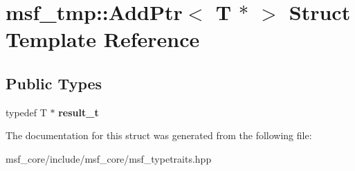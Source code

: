 \hypertarget{structmsf__tmp_1_1AddPtr_3_01T_01_5_01_4}{\section{msf\-\_\-tmp\-:\-:Add\-Ptr$<$ T $\ast$ $>$ Struct Template Reference}
\label{structmsf__tmp_1_1AddPtr_3_01T_01_5_01_4}
}
\subsection*{Public Types}
\begin{DoxyCompactItemize}
\item 
\hypertarget{structmsf__tmp_1_1AddPtr_3_01T_01_5_01_4_ad665c44a1e3f8154bb2033e80095a8cb}{typedef T $\ast$ {\bfseries result\-\_\-t}}\label{structmsf__tmp_1_1AddPtr_3_01T_01_5_01_4_ad665c44a1e3f8154bb2033e80095a8cb}

\end{DoxyCompactItemize}


The documentation for this struct was generated from the following file\-:\begin{DoxyCompactItemize}
\item 
msf\-\_\-core/include/msf\-\_\-core/msf\-\_\-typetraits.\-hpp\end{DoxyCompactItemize}
